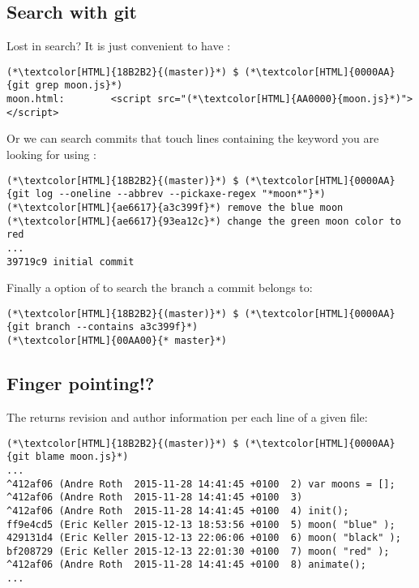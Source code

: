 \subsection{Search with git}
\begin{frame}[fragile]
  \subslidetitle
  Lost in search? It is just convenient to have :
  \begin{lstlisting}
(*\textcolor[HTML]{18B2B2}{(master)}*) $ (*\textcolor[HTML]{0000AA}{git grep moon.js}*)
moon.html:        <script src="(*\textcolor[HTML]{AA0000}{moon.js}*)"></script>
\end{lstlisting}

  Or we can search commits that touch lines containing the keyword you are looking for using :
  \begin{lstlisting}
(*\textcolor[HTML]{18B2B2}{(master)}*) $ (*\textcolor[HTML]{0000AA}{git log --oneline --abbrev --pickaxe-regex "*moon*"}*)
(*\textcolor[HTML]{ae6617}{a3c399f}*) remove the blue moon
(*\textcolor[HTML]{ae6617}{93ea12c}*) change the green moon color to red
...
39719c9 initial commit
\end{lstlisting}

  Finally a option of  to search the branch a commit belongs to:
  \begin{lstlisting}
(*\textcolor[HTML]{18B2B2}{(master)}*) $ (*\textcolor[HTML]{0000AA}{git branch --contains a3c399f}*)
(*\textcolor[HTML]{00AA00}{* master}*)
\end{lstlisting}
\end{frame}

\subsection{Finger pointing!?}
\begin{frame}[fragile]
  \subslidetitle

  The  returns revision and author information per each line of a given file:
  \begin{lstlisting}
(*\textcolor[HTML]{18B2B2}{(master)}*) $ (*\textcolor[HTML]{0000AA}{git blame moon.js}*)
...
^412af06 (Andre Roth  2015-11-28 14:41:45 +0100  2) var moons = [];
^412af06 (Andre Roth  2015-11-28 14:41:45 +0100  3)
^412af06 (Andre Roth  2015-11-28 14:41:45 +0100  4) init();
ff9e4cd5 (Eric Keller 2015-12-13 18:53:56 +0100  5) moon( "blue" );
429131d4 (Eric Keller 2015-12-13 22:06:06 +0100  6) moon( "black" );
bf208729 (Eric Keller 2015-12-13 22:01:30 +0100  7) moon( "red" );
^412af06 (Andre Roth  2015-11-28 14:41:45 +0100  8) animate();
...
\end{lstlisting}

\end{frame}

